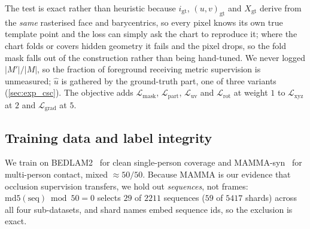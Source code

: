 The test is exact rather than heuristic because $i_{\mathrm{gt}}$, $(u,v)_{\mathrm{gt}}$ and
$X_{\mathrm{gt}}$ derive from the \emph{same} rasterised face and barycentrics, so every pixel
knows its own true template point and the loss can simply ask the chart to reproduce it; where the
chart folds or covers hidden geometry it fails and the pixel drops, so the fold mask falls out of
the construction rather than being hand-tuned. We never logged $|M'|/|M|$, so the fraction of
foreground receiving metric supervision is unmeasured; $\hat u$ is gathered by the ground-truth
part, one of three variants (\cref{sec:exp_csc}). The objective adds $\mathcal{L}_{\mathrm{mask}}$,
$\mathcal{L}_{\mathrm{part}}$, $\mathcal{L}_{\mathrm{uv}}$ and $\mathcal{L}_{\mathrm{rot}}$ at
weight $1$ to $\mathcal{L}_{\mathrm{xyz}}$ at $2$ and $\mathcal{L}_{\mathrm{grad}}$ at $5$.

\subsection{Training data and label integrity}
\label{sec:data}

We train on BEDLAM2~\cite{tesch2025bedlam2} for clean single-person coverage and
MAMMA-syn~\cite{cuevas2025mamma} for multi-person contact, mixed ${\approx}50/50$. Because MAMMA is
our evidence that occlusion supervision transfers, we hold out \emph{sequences}, not frames:
$\mathrm{md5}(\text{seq})\bmod50=0$ selects $29$ of $2211$ sequences ($59$ of $5417$ shards) across
all four sub-datasets, and shard names embed sequence ids, so the exclusion is exact.

